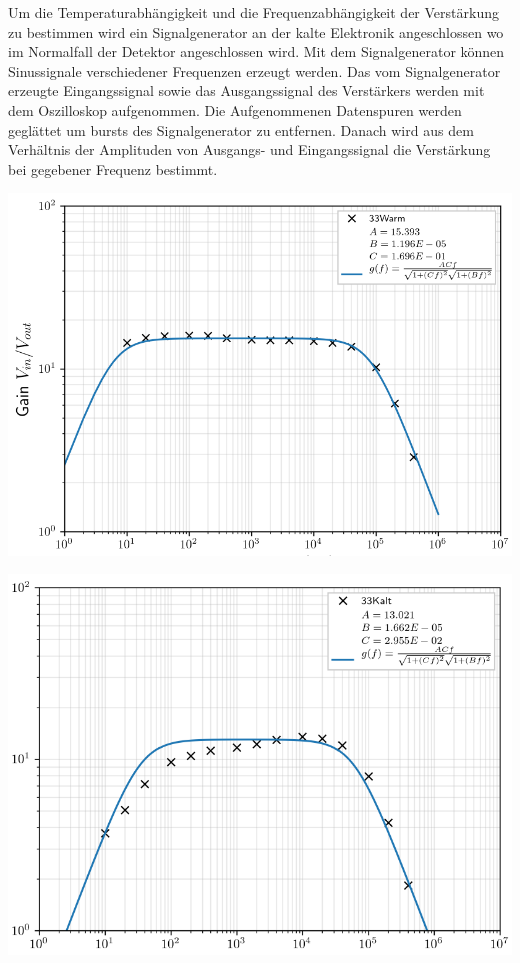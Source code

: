 Um die Temperaturabhängigkeit und die Frequenzabhängigkeit der Verstärkung zu bestimmen wird ein Signalgenerator an der kalte Elektronik angeschlossen wo im Normalfall der Detektor angeschlossen wird.
Mit dem Signalgenerator können Sinussignale verschiedener Frequenzen erzeugt werden.
Das vom Signalgenerator erzeugte Eingangssignal sowie das Ausgangssignal des Verstärkers werden mit dem Oszilloskop aufgenommen.
Die Aufgenommenen Datenspuren werden geglättet um bursts des Signalgenerator zu entfernen.
Danach wird aus dem Verhältnis der Amplituden von Ausgangs- und Eingangssignal die Verstärkung bei gegebener Frequenz bestimmt.

\begin{minipage}[!c]{\textwidth}


\begin{minipage}[c]{\textwidth}
\begin{minipage}[c]{0.5\textwidth}
\includegraphics[width=\textwidth]{./fig/Gain/G33Warm.pdf}
\end{minipage}
\begin{minipage}[c]{0.5\textwidth}
\includegraphics[width=\textwidth]{./fig/Gain/G33Cold.pdf}

\end{minipage}
\end{minipage}
\end{minipage}
